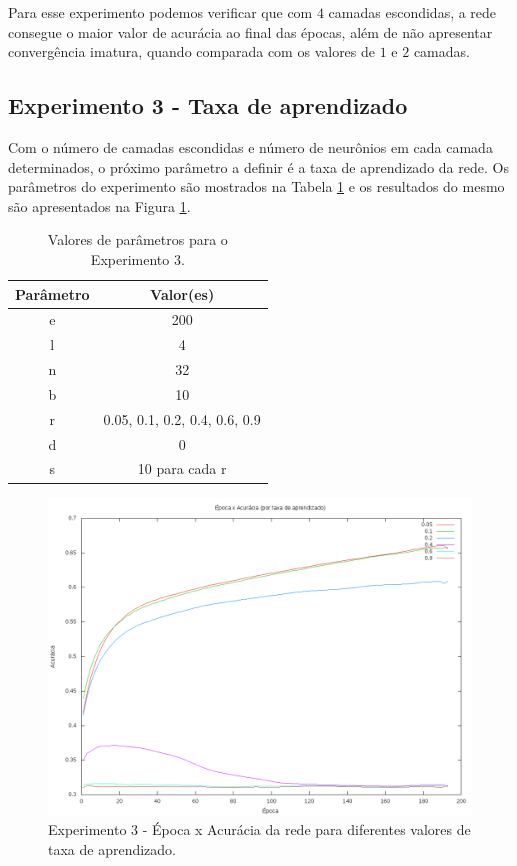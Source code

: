 \documentclass[12pt]{article}
\begin{document}
Para esse experimento podemos verificar que com $ 4 $ camadas escondidas,
a rede consegue o maior valor de acurácia ao final das épocas, além 
de não apresentar convergência imatura, quando comparada com os valores
de $ 1 $ e $ 2 $ camadas.

\subsection{Experimento 3 - Taxa de aprendizado}

Com o número de camadas escondidas e número de neurônios em cada camada
determinados, o próximo parâmetro a definir é a taxa de aprendizado
da rede. Os parâmetros do experimento são mostrados na Tabela
\ref{tab:exp3} e os resultados do mesmo são apresentados na Figura
\ref{fig:exp3}.

\begin{table}[h]
	\centering
	\begin{tabular}{|c|c|}
		\hline
		\textbf{Parâmetro} & \textbf{Valor(es)} \\ \hline
		e & 200 \\ \hline
		l & 4 \\ \hline
		n & 32 \\ \hline
		b & 10 \\ \hline
		r & 0.05, 0.1, 0.2, 0.4, 0.6, 0.9 \\ \hline
		d & 0 \\ \hline
		s & 10 para cada r \\ \hline
	\end{tabular}
	\caption{\label{tab:exp3} Valores de parâmetros para o Experimento
	3.}
\end{table}

\begin{figure}[h]
  \centering
  \includegraphics[width=1\textwidth]{../tests/3-lrate/graph.png}
  \caption{Experimento 3 - Época x Acurácia da rede para diferentes
  valores de taxa de aprendizado.}
  \label{fig:exp3}
\end{figure}
\end{document}
